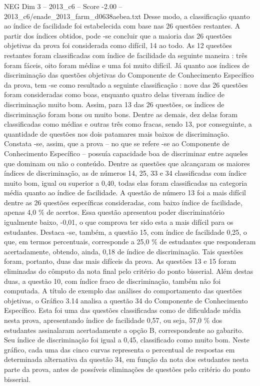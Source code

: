 \begin{textsample}{NEG Dim 3 – 2013\_c6 – Score -2.00 – 2013\_c6/enade\_2013\_farm\_d0638aebea.txt}
Desse modo, a classificação quanto ao índice de facilidade foi estabelecida com base nas 26 questões restantes.
A partir dos índices obtidos, pode -se concluir que a maioria das 26 questões objetivas da prova foi considerada como difícil, 14 ao todo.
As 12 questões restantes foram classificadas com índice de facilidade da seguinte maneira : três foram fáceis, oito foram médias e uma foi muito difícil.
Já quanto aos índices de discriminação das questões objetivas do Componente de Conhecimento Específico da prova, tem -se como resultado a seguinte classificação : nove das 26 questões foram consideradas como boas, enquanto quatro delas tiveram índice de discriminação muito bom.
Assim, para 13 das 26 questões, os índices de discriminação foram bons ou muito bons.
Dentre as demais, dez delas foram classificadas como médias e outras três como fracas, sendo 13, por conseguinte, a quantidade de questões nos dois patamares mais baixos de discriminação.
Constata -se, assim, que a prova – no que se refere -se ao Componente de Conhecimento Específico – possuía capacidade boa de discriminar entre aqueles que dominam ou não o conteúdo.
Dentre as questões que alcançaram os maiores índices de discriminação, as de números 14, 25, 33 e 34 classificadas com índice muito bom, igual ou superior a 0,40, todas elas foram classificadas na categoria média quanto ao índice de facilidade.
A questão de número 13 foi a mais difícil dentre as 26 questões específicas consideradas, com baixo índice de facilidade, apenas 4,0 \% de acertos.
Essa questão apresentou poder discriminatório igualmente baixo, -0,01, o que comprova ter sido esta a mais difícil para os estudantes.
Destaca -se, também, a questão 15, com índice de facilidade 0,25, o que, em termos percentuais, corresponde a 25,0 \% de estudantes que responderam acertadamente, obtendo, ainda, 0,18 de índice de discriminação.
Tais questões foram, portanto, duas das mais difíceis da prova.
As questões 13 e 15 foram eliminadas do cômputo da nota final pelo critério do ponto bisserial.
Além destas duas, a questão 10, com índice fraco de discriminação, também não foi computada.
A título de exemplo das análises do comportamento das questões objetivas, o Gráfico 3.14 analisa a questão 34 do Componente de Conhecimento Específico.
Esta foi uma das questões classificadas como de dificuldade média nesta prova, apresentando índice de facilidade 0,57, ou seja, 57,0 \% dos estudantes assinalaram acertadamente a opção B, correspondente ao gabarito.
Seu índice de discriminação foi igual a 0,45, classificado como muito bom.
Neste gráfico, cada uma das cinco curvas representa o percentual de respostas em determinada alternativa da questão 34, em função da nota dos estudantes nesta parte da prova, antes de possíveis eliminações de questões pelo critério do ponto bisserial.

\end{textsample}
